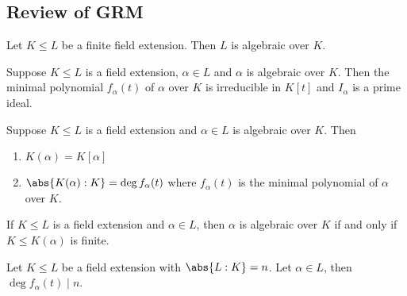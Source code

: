 \documentclass{article}
\begin{document}



























\subsection{Review of GRM}



\begin{nlemma}\label{lem:1.5}
    Let $K \leq L$ be a finite field extension. Then $L$ is algebraic over $K$.
\end{nlemma}




\begin{nlemma}\label{lem:1.7}
    Suppose $K \leq L$ is a field extension, $\alpha \in L$ and $\alpha$ is algebraic over $K$.
    Then the minimal polynomial $f_\alpha(t)$ of $\alpha$ over $K$ is irreducible in $K[t]$ and $I_\alpha$ is a prime ideal.
\end{nlemma}



\begin{nthm}\label{thm:1.9}
    Suppose $K \leq L$ is a field extension and $\alpha \in L$ is algebraic over $K$.  Then
    \begin{enumerate}[label=(\roman*)]
        \item  $K(\alpha) = K[\alpha]$
        \item $\abs{K(\alpha) : K} = \deg f_\alpha(t)$ where $f_\alpha(t)$ is the minimal polynomial of $\alpha$ over $K$.
    \end{enumerate}
\end{nthm}

\begin{ncor}\label{cor:1.10}
    If $K \leq L$ is a field extension and $\alpha \in L$, then $\alpha$ is algebraic over $K$ if and only if $K \leq K(\alpha)$ is finite.
\end{ncor}

\begin{ncor}\label{cor:1.11}
    Let $K \leq L$ be a field extension with $\abs{L:K} = n$. Let $\alpha \in L$, then $\deg f_\alpha(t) \mid n$.
\end{ncor}
\end{document}
